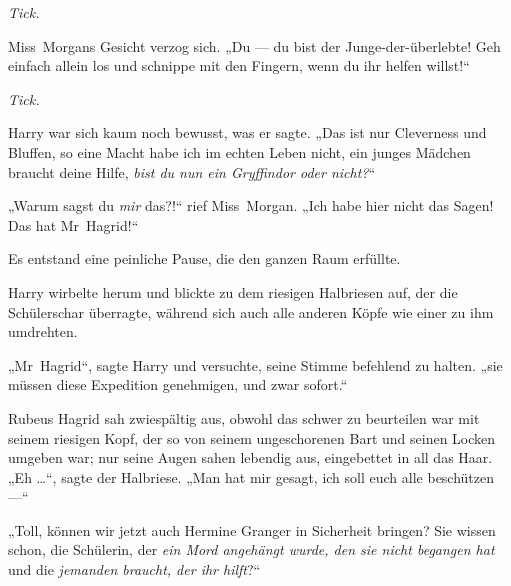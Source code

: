 \emph{Tick.}

Miss~Morgans Gesicht verzog sich.
„Du — du bist der Junge-der-überlebte! Geh einfach allein los und schnippe mit den Fingern, wenn du ihr helfen willst!“

\emph{Tick.}

Harry war sich kaum noch bewusst, was er sagte.
„Das ist nur Cleverness und Bluffen, so eine Macht habe ich im echten Leben nicht, ein junges Mädchen braucht deine Hilfe, \emph{bist du nun ein Gryffindor oder nicht?}“

„Warum sagst du \emph{mir} das?!“ rief Miss~Morgan.
„Ich habe hier nicht das Sagen! Das hat Mr~Hagrid!“

Es entstand eine peinliche Pause, die den ganzen Raum erfüllte.

Harry wirbelte herum und blickte zu dem riesigen Halbriesen auf, der die Schülerschar überragte, während sich auch alle anderen Köpfe wie einer zu ihm umdrehten.

„Mr~Hagrid“, sagte Harry und versuchte, seine Stimme befehlend zu halten.
„sie müssen diese Expedition genehmigen, und zwar sofort.“

Rubeus Hagrid sah zwiespältig aus, obwohl das schwer zu beurteilen war mit seinem riesigen Kopf, der so von seinem ungeschorenen Bart und seinen Locken umgeben war; nur seine Augen sahen lebendig aus, eingebettet in all das Haar.
„Eh …“, sagte der Halbriese.
„Man hat mir gesagt, ich soll euch alle beschützen —“

„Toll, können wir jetzt auch Hermine Granger in Sicherheit bringen? Sie wissen schon, die Schülerin, der \emph{ein Mord angehängt wurde, den sie nicht begangen hat} und die \emph{jemanden braucht, der ihr hilft}?“

